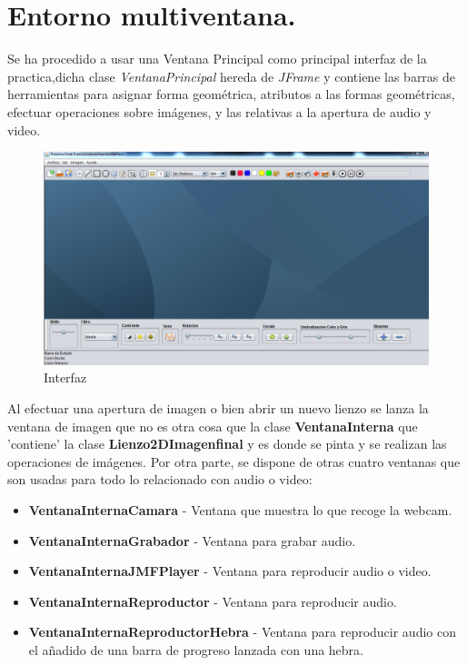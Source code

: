 \section{Entorno multiventana. }
Se ha procedido a usar una Ventana Principal como principal interfaz de la practica,dicha clase \emph{VentanaPrincipal} hereda de \emph{JFrame} y contiene las barras de herramientas para asignar forma geométrica, atributos a las formas geométricas, efectuar operaciones sobre imágenes, y las relativas a la apertura de audio y video.
\begin{figure}[H]
  \centering
    \includegraphics[scale=0.45]{images/interfaz_}
  \caption{Interfaz}
  \label{Interfaz}
\end{figure}
Al efectuar una apertura de imagen o bien abrir un nuevo lienzo se lanza la ventana de imagen que no es otra cosa que la clase \textbf{VentanaInterna} que 'contiene' la clase \textbf{Lienzo2DImagenfinal} y es donde se pinta y se realizan las operaciones de imágenes.
Por otra parte, se dispone de otras cuatro ventanas que son usadas para todo lo relacionado con audio o video:
\begin{itemize}
\item \textbf{VentanaInternaCamara} - Ventana que muestra lo que recoge la webcam.
\item \textbf{VentanaInternaGrabador} - Ventana para grabar audio.
\item \textbf{VentanaInternaJMFPlayer} - Ventana para reproducir audio o video.
\item \textbf{VentanaInternaReproductor} - Ventana para reproducir audio.
\item \textbf{VentanaInternaReproductorHebra} - Ventana para reproducir audio con el añadido de una barra de progreso lanzada con una hebra.

\end{itemize}
